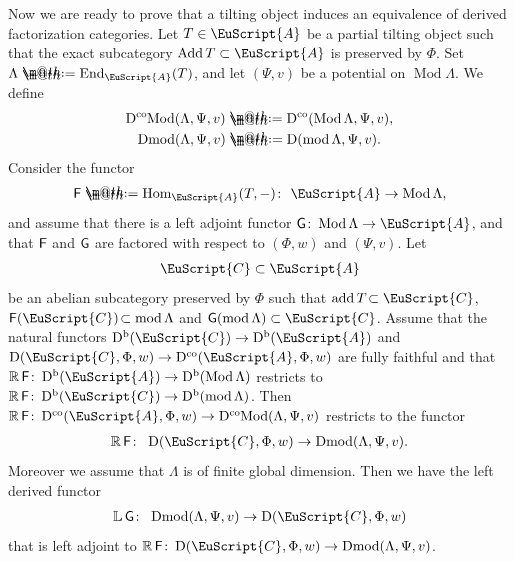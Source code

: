 \documentclass[10pt,a4paper]{amsart}
\makeatletter
\newcommand*{\defeq}{\mathrel{\rlap{%
 \raisebox{0.3ex}{$\m@th\cdot$}}%
 \raisebox{-0.3ex}{$\m@th\cdot$}}%
 =}
\numberwithin{equation}{section}
\newcommand{\Dmod}{\operatorname{Dmod}}
\newcommand{\DcoMod}{\operatorname{D^{co}\hspace{-0.1mm}Mod}}
\newcommand{\Hom}{\operatorname{Hom}}
\newcommand{\End}{\operatorname{End}}
\newcommand{\Mod}{\operatorname{Mod}}
\newcommand{\fmod}{\operatorname{mod}}
\newcommand{\add}{\operatorname{add}}
\newcommand{\Add}{\operatorname{Add}}
\newcommand{\Db}{\operatorname{D^b}}
\newcommand{\Dco}{\operatorname{D^{co}}}
\newcommand{\D}{\operatorname{D}}
\newcommand{\bL}{\mathbb{L}}
\newcommand{\bR}{\mathbb{R}}
\newcommand{\scrA}{\EuScript{A}}
\newcommand{\scrC}{\EuScript{C}}
\newcommand{\F}{\operatorname{\sf{F}}}
\newcommand{\G}{\operatorname{\sf{G}}}
\makeatother
\begin{document}
Now we are ready to prove that a tilting object induces an equivalence of derived factorization categories. Let $T\in \scrA$ be a partial tilting object such that the exact subcategory $\Add T\subset \scrA$ is preserved by $\Phi$. Set $\Lambda\defeq\End_{\scrA}(T)$, and
 let $(\Psi,v)$ be a potential on $\Mod\Lambda$. We define
 \begin{gather*}
 \DcoMod(\Lambda,\Psi,v)\defeq\Dco(\Mod\Lambda,\Psi,v),
 \\
 \Dmod(\Lambda,\Psi,v)\defeq\D(\fmod\Lambda,\Psi,v).
 \end{gather*}
Consider the functor
 \begin{gather*}
 \F\defeq\Hom_{\scrA}(T,-)\colon\ \scrA\to \Mod\Lambda,
 \end{gather*}
 and assume that there is a left adjoint functor $\G\colon \Mod\Lambda\to \scrA$, and that $\F$ and $\G$ are factored with respect to $(\Phi,w)$ and $(\Psi,v)$. Let
 \begin{gather*}
 \scrC\subset \scrA
 \end{gather*}
 be an abelian subcategory preserved by $\Phi$ such that $\add T\!\subset \scrC$, $\F(\scrC)\!\subset \fmod\Lambda$ and \mbox{$\G(\fmod\Lambda)\subset \scrC$}. Assume that the natural functors $\Db(\scrC)\to\Db(\scrA)$ and $\D(\scrC,\Phi,w)\to \Dco(\scrA,\Phi,w)$ are fully faithful and that $\bR \F\colon\Db(\scrA)\to\Db(\Mod\Lambda)$ restricts to $\bR \F\colon\Db(\scrC)\to\Db(\fmod\Lambda)$. Then $\bR \F\colon\Dco(\scrA,\Phi,w)\to \DcoMod(\Lambda,\Psi,v)$ restricts to the functor
\begin{gather*}
\bR \F\colon\ \D(\scrC,\Phi,w)\to \Dmod(\Lambda,\Psi,v).
\end{gather*}
Moreover we assume that $\Lambda$ is of finite global dimension. Then we have the left derived functor
\begin{gather*}
\bL\G\colon\ \Dmod(\Lambda,\Psi,v)\to \D(\scrC,\Phi,w)
\end{gather*}
that is left adjoint to $\bR\F\colon\D(\scrC,\Phi,w)\to \Dmod(\Lambda,\Psi,v)$.
\end{document}
